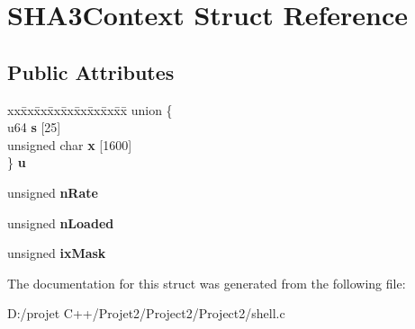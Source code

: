 \hypertarget{struct_s_h_a3_context}{}\section{S\+H\+A3\+Context Struct Reference}
\label{struct_s_h_a3_context}
\subsection*{Public Attributes}
\begin{DoxyCompactItemize}
\item 
\mbox{\label{struct_s_h_a3_context_a21bef3a7a03b4bd69ce503af43b3dc66}} 
\begin{tabbing}
xx\=xx\=xx\=xx\=xx\=xx\=xx\=xx\=xx\=\kill
union \{\\
\>u64 {\bfseries s} \mbox{[}25\mbox{]}\\
\>unsigned char {\bfseries x} \mbox{[}1600\mbox{]}\\
\} {\bfseries u}\\

\end{tabbing}\item 
\mbox{\label{struct_s_h_a3_context_a22fc5e072ef8924400267fee73dfb23f}} 
unsigned {\bfseries n\+Rate}
\item 
\mbox{\label{struct_s_h_a3_context_aa4e83212aa13ac9f1eb3e42f831da090}} 
unsigned {\bfseries n\+Loaded}
\item 
\mbox{\label{struct_s_h_a3_context_a970ac15a9c7454ff82f81f9764e3ff4d}} 
unsigned {\bfseries ix\+Mask}
\end{DoxyCompactItemize}


The documentation for this struct was generated from the following file\+:\begin{DoxyCompactItemize}
\item 
D\+:/projet C++/\+Projet2/\+Project2/\+Project2/shell.\+c\end{DoxyCompactItemize}
